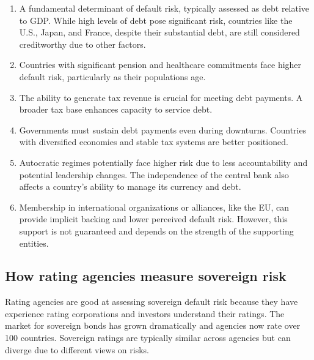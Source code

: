 \begin{enumerate}
\item {} A fundamental determinant of default risk,
typically assessed as debt relative to GDP. While high levels of debt pose
significant risk, countries like the U.S., Japan, and France, despite their
substantial debt, are still considered creditworthy due to other factors.
\item {} Countries with significant
pension and healthcare commitments face higher default risk, particularly as their
populations age.
\item {} The ability to generate tax revenue is crucial for
meeting debt payments. A broader tax base enhances capacity to service debt.
\item {} Governments must sustain debt payments
even during downturns. Countries with diversified economies and stable tax systems
are better positioned.
\item {} Autocratic regimes potentially face higher risk due
to less accountability and potential leadership changes. The independence of the
central bank also affects a country's ability to manage its currency and debt.
\item {}
Membership in international organizations or alliances, like the EU, can provide
implicit backing and lower perceived default risk. However, this support is not
guaranteed and depends on the strength of the supporting entities.
\end{enumerate}

\subsection*{How rating agencies measure sovereign risk}

Rating agencies are good at assessing sovereign default risk because they have
experience rating corporations and investors understand their ratings. The market
for sovereign bonds has grown dramatically and agencies now rate over 100
countries. Sovereign ratings are typically similar across agencies but can
diverge due to different views on risks.

